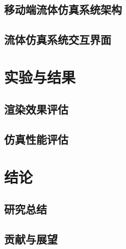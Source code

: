 \section{移动端流体仿真系统架构}
\section{流体仿真系统交互界面}



\chapter{实验与结果}

\section{渲染效果评估}
\section{仿真性能评估}


\chapter{结论}

\section{研究总结}
\section{贡献与展望}

